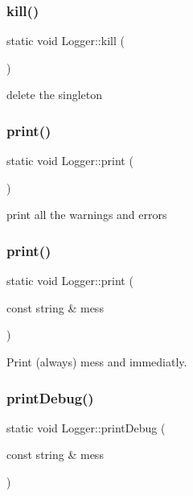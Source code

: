 \subsubsection{\texorpdfstring{kill()}{kill()}}
{\footnotesize\ttfamily static void Logger\+::kill (\begin{DoxyParamCaption}{ }\end{DoxyParamCaption})\hspace{0.3cm}{\ttfamily [static]}}

delete the singleton \mbox{\label{classLogger_a563a895bb1f8087848356d6ddf66e215}} 
\subsubsection{\texorpdfstring{print()}{print()}\hspace{0.1cm}{\footnotesize\ttfamily [1/2]}}
{\footnotesize\ttfamily static void Logger\+::print (\begin{DoxyParamCaption}{ }\end{DoxyParamCaption})\hspace{0.3cm}{\ttfamily [static]}}

print all the warnings and errors \mbox{\label{classLogger_ad758e3048abf6472bec574e3513360e3}} 
\subsubsection{\texorpdfstring{print()}{print()}\hspace{0.1cm}{\footnotesize\ttfamily [2/2]}}
{\footnotesize\ttfamily static void Logger\+::print (\begin{DoxyParamCaption}\item[{const string \&}]{mess }\end{DoxyParamCaption})\hspace{0.3cm}{\ttfamily [static]}}

Print (always) mess and immediatly. \mbox{\label{classLogger_a08aae7defa6b2371c54bee304969a3a2}} 
\subsubsection{\texorpdfstring{print\+Debug()}{printDebug()}}
{\footnotesize\ttfamily static void Logger\+::print\+Debug (\begin{DoxyParamCaption}\item[{const string \&}]{mess }\end{DoxyParamCaption})\hspace{0.3cm}{\ttfamily [static]}}

